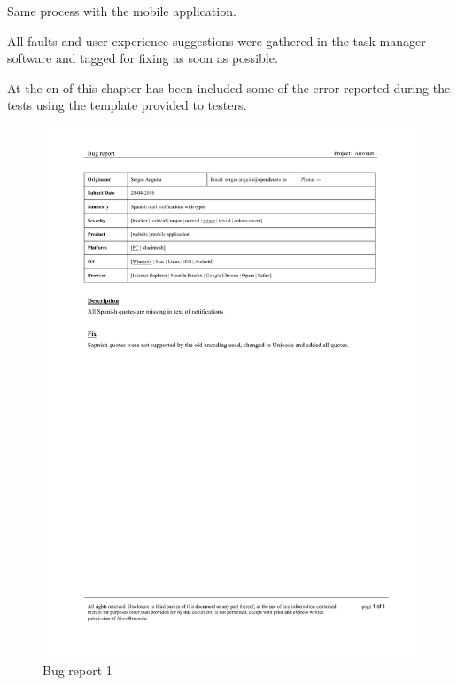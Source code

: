 \documentclass{DeustoFDP}
\begin{document}
Same process with the mobile application.

All faults and user experience suggestions were gathered in the task manager software and tagged for fixing as soon as possible.

At the en of this chapter has been included some of the error reported during the tests using the template provided to testers.
\newpage

\begin{figure}[h!]
	\centering
	\includegraphics[width=1\linewidth]{fig/Bugs/b1}
	\caption[Bug report]{Bug report 1}
	\label{fig:b1}
\end{figure}
\end{document}
